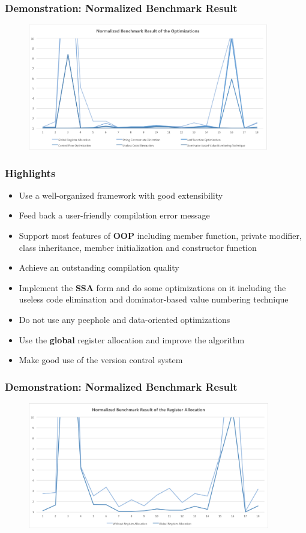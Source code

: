 \documentclass{beamer}
\begin{document}
	\begin{frame}
		\frametitle{Demonstration: Normalized Benchmark Result}
		\begin{figure}[!htp]
			\includegraphics[height=5.5cm]{image/benchmark/optimization}
		\end{figure}
	\end{frame}

	\begin{frame}
		\frametitle{Highlights}
		\begin{itemize}
			\item Use a well-organized framework with good extensibility
			\item Feed back a user-friendly compilation error message
			\item Support most features of \textbf{OOP} including member function, private modifier, class inheritance, member initialization and constructor function
			\item Achieve an outstanding compilation quality
			\item Implement the \textbf{SSA} form and do some optimizations on it including the useless code elimination and dominator-based value numbering technique
			\item Do not use any peephole and data-oriented optimizations
			\item Use the \textbf{global} register allocation and improve the algorithm
			\item<0-0> Make good use of the version control system
		\end{itemize}
	\end{frame}

	\begin{frame}
		\frametitle{Demonstration: Normalized Benchmark Result}
		\begin{figure}[!htp]
			\includegraphics[height=5.5cm]{image/benchmark/register-allocation}
		\end{figure}
	\end{frame}
\end{document}
